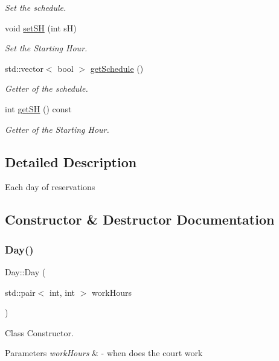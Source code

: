 \begin{DoxyCompactItemize}
\begin{DoxyCompactList}\small\item\em Set the schedule. \end{DoxyCompactList}\item 
void \mbox{\hyperlink{class_day_a6fc6dfeef1c92b9a5395648c4d0c8a70}{set\+SH}} (int sH)
\begin{DoxyCompactList}\small\item\em Set the Starting Hour. \end{DoxyCompactList}\item 
std\+::vector$<$ bool $>$ \mbox{\hyperlink{class_day_a89096a2d290b712108feb7fe3bf7da51}{get\+Schedule}} ()
\begin{DoxyCompactList}\small\item\em Getter of the schedule. \end{DoxyCompactList}\item 
int \mbox{\hyperlink{class_day_ab730d15c19486aa3c45839e8f5990c57}{get\+SH}} () const
\begin{DoxyCompactList}\small\item\em Getter of the Starting Hour. \end{DoxyCompactList}\end{DoxyCompactItemize}


\subsection{Detailed Description}
Each day of reservations 

\subsection{Constructor \& Destructor Documentation}
\mbox{\label{class_day_a0ba7af88eca9b5e6ca197c3d40b3ca66}} 
\subsubsection{\texorpdfstring{Day()}{Day()}}
{\footnotesize\ttfamily Day\+::\+Day (\begin{DoxyParamCaption}\item[{std\+::pair$<$ int, int $>$}]{work\+Hours }\end{DoxyParamCaption})}



Class Constructor. 


\begin{DoxyParams}{Parameters}
{\em work\+Hours} & -\/ when does the court work \\
\hline
\end{DoxyParams}


